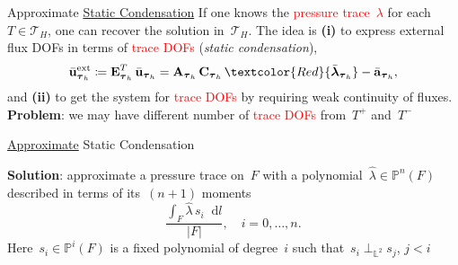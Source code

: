 \documentclass[svgnames]{beamer} %
\newcommand{\svginputw}[2][\linewidth]{\def\svgwidth{#1}} %
\newcommand{\vect}[1]{\boldsymbol{\mathbf{#1}}}
\newcommand{\bmesh}{{\vect{\mathcal T}_H}}
\newcommand{\mmesh}{{\vect{\mathcal \tau}_h}}
\newcommand{\bfaces}[1][]{{\vect{\mathcal F}_{\text{#1}}}}
\newcommand{\mfaces}[1][]{{\vect{\mathcal f}_{\text{#1}}}}
\newcommand{\LTwo}{{\mathbb L^2}}
\newcommand{\PnSpace}[2]{{\mathbb P^{#1}\left({#2}\right)}}
\newcommand*\diff{\mathop{}\!\mathrm{d}}
\begin{document}
	\begin{frame}{Approximate \ul{Static Condensation}}
		If one knows the \textcolor{Red}{pressure trace~$\lambda$} for each~$T \in \bmesh$, one can recover the solution in~$\bmesh$. The idea is \textbf{(i)} to express external flux DOFs in terms of \textcolor{Red}{trace DOFs} (\textit{static condensation}),
		$$
			\bar{\vect u}^\text{ext}_\mmesh \coloneqq \vect E_\mmesh^T\,\bar{\vect u}_\mmesh = \vect A_\mmesh\,\vect C_\mmesh\,\textcolor{Red}{\bar{\vect \lambda}_\mmesh} - \bar{\vect a}_\mmesh,
		$$
		and \textbf{(ii)} to get the system for \textcolor{Red}{trace DOFs} by requiring weak continuity of fluxes. 
		\textbf{Problem}: we may have different number of \textcolor{Red}{trace DOFs} from~$T^+$ and~$T^-$	
		\begin{figure}
			\centering
			\svginputw[.6\linewidth]{e_plus_e_minus.pdf_tex}
		\end{figure}
	\end{frame}

	\begin{frame}{\ul{Approximate} Static Condensation}
		\begin{figure}
			\centering
			\svginputw[.6\linewidth]{e_plus_e_minus.pdf_tex}
		\end{figure}
		\textbf{Solution}: approximate a pressure trace on~$F$ with a polynomial~$\hat\lambda \in \PnSpace{n}{F}$ described in terms of its~$(n+1)$ moments
		\begin{equation*}
		\frac{\int_F \hat \lambda\,s_i \diff l}{|F|}, \quad i = 0, \dots, n.
		\end{equation*}
		Here~$s_i \in \PnSpace{i}{F}$ is a fixed polynomial of degree~$i$ such that~$s_i \perp_\LTwo s_j$, $j < i$
	\end{frame}
\end{document}
